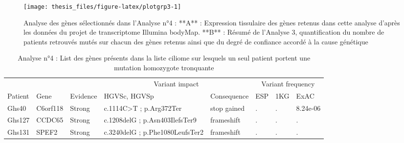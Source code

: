 \documentclass[12pt,twoside]{reedthesis}
\theoremstyle{definition}
\theoremstyle{definition}
\theoremstyle{remark}
\begin{document}
  \newpage  
  
  \begin{figure}
  
  {\centering \texttt{[image: thesis\_files/figure-latex/plotgrp3-1]} 
  
  }
  
  \caption[Analyse des gènes sélectionnés dans l'Analyse n°4]{Analyse des gènes sélectionnés dans l'Analyse n°4 : **A** : Expression tissulaire des gènes retenus dans cette analyse d'après les données du projet de transcriptome Illumina bodyMap. **B** : Résumé de l'Analyse 3, quantification du nombre de patients retrouvés mutés sur chacun des gènes retenus ainsi que du degré de confiance accordé à la cause génétique}\label{fig:plotgrp3}
  \end{figure}
  
  \newpage
  
  \begin{landscape}
  \begin{longtable}[t]{llllllll}
  \caption{\label{tab:tabgrp3high}Analyse n°4 : List des gènes présents dans la liste ciliome sur lesquels un seul patient portent une mutation homozygote tronquante}\\
  \toprule
  \multicolumn{1}{c}{ } & \multicolumn{1}{c}{ } & \multicolumn{1}{c}{ } & \multicolumn{2}{c}{Variant impact} & \multicolumn{3}{c}{Variant frequency} \\
  \cmidrule(l{2pt}r{2pt}){4-5} \cmidrule(l{2pt}r{2pt}){6-8}
  Patient & Gene & Evidence & HGVSc, HGVSp & Consequence & ESP & 1KG & ExAC\\
  \midrule
  Ghs40 & C6orf118 & Strong & c.1114C>T ; p.Arg372Ter & stop gained & . & . & 8.24e-06\\
  Ghs127 & CCDC65 & Strong & c.1208delG ; p.Asn403IlefsTer9 & frameshift & . & . & .\\
  Ghs131 & SPEF2 & Strong & c.3240delG ; p.Phe1080LeufsTer2 & frameshift & . & . & .\\
  \bottomrule
  \end{longtable}
  \end{landscape}
  
\end{document}
